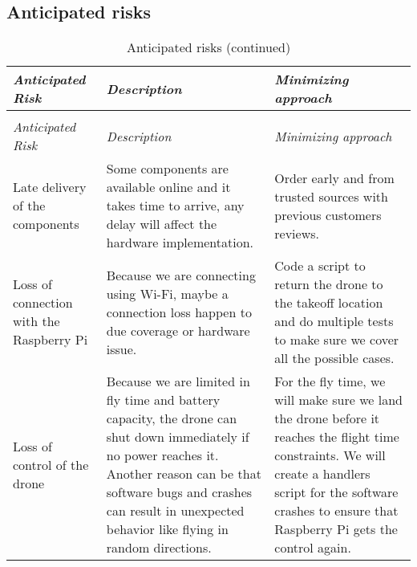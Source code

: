 \documentclass[../main.tex]{subfiles}
\begin{document}


\subsection{Anticipated risks}

\begin{center}
    \begin{xltabular}{\textwidth}{ X X X }
        \caption{Anticipated risks.}
        \label{tab:risks} \\
        \toprule
        \textit{Anticipated Risk} 
        & \textit{Description} 
        & \textit{Minimizing approach} \\
        \midrule
        \endfirsthead

        \caption[]{Anticipated risks (continued)} \\
        \toprule
        \textit{Anticipated Risk} 
        & \textit{Description} 
        & \textit{Minimizing approach} \\
        \midrule
        \endhead

        Late delivery of the components 
        & Some components are available online 
        and it takes time to arrive, 
        any delay will affect the hardware implementation.
        & Order early and from trusted sources with previous 
        customers reviews. \\
        
        Loss of connection with the Raspberry Pi
        & Because we are connecting using Wi-Fi, 
        maybe a connection loss 
        happen to due coverage or hardware issue.
        & Code a script to return the drone 
        to the takeoff location 
        and do multiple tests to make sure 
        we cover all the possible cases. \\
        
        Loss of control of the drone
        & Because we are limited in fly time 
        and battery capacity, 
        the drone can shut down immediately if 
        no power reaches it.
        Another reason can be that software bugs 
        and crashes can 
        result in unexpected behavior like flying 
        in random directions.
        & For the fly time, we will make sure 
        we land the drone before it reaches 
        the flight time constraints.
        We will create a handlers script 
        for the software crashes 
        to ensure that Raspberry Pi gets the 
        control again.  \\
        

\end{xltabular}
\end{center}
\end{document}

